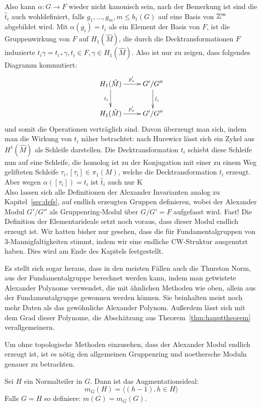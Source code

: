  Also kann $\alpha:G\to F$ wieder nicht kanonisch sein, nach der Bemerkung ist sind die $\hat t_i$ auch wohldefiniert, falls $g_1,\dots,g_m, m\leq b_1(G)$ auf eine Basis von $\mathbb{Z}^m$ abgebildet wird.
 Mit $\alpha(g_i)=t_i$ als ein Element der Basis von $F$, ist die Gruppenwirkung von $F$ auf $H_1(\hat M)$, die durch die Decktransformationen $F$ induzierte $t_i\gamma = t_{i*}\gamma,t_i \in F , \gamma \in H_1(\hat M)$. Also ist nur zu zeigen, dass folgendes Diagramm kommutiert:
\[
	\begin{xy}
		\xymatrix{H_1(\hat M) \ar[d]_{t_i} \ar[r]^{p'_*} & G'/G'' \ar[d]^{\hat t_i}\\
		H_1(\hat M)  \ar[r]^{p'_*} & G'/G'' }
	\end{xy}
\]
und somit die Operationen verträglich sind. Davon überzeugt man sich, indem man die Wirkung von $t_i$ näher betrachtet: nach Hurewicz lässt sich ein Zykel aus $H^1(\hat M)$ als Schleife darstellen. Die Decktransformation $t_i$ schiebt diese Schleife nun auf eine Schleife, die homolog ist zu der Konjugation mit einer zu einem Weg gelifteten Schleife $\tau_i, [\tau_i] \in \pi_1(M)$, welche die Decktransformation $t_i$ erzeugt. Aber wegen $\alpha([\tau_i])=t_i$ ist $\hat t_i$ auch nur K \\
Also lassen sich alle Definitionen der Alexander Invarianten analog zu Kapitel~\ref{sec:defs}, auf endlich erzeugten Gruppen definieren, wobei der Alexander Modul $G'/G''$ als Gruppenring-Modul über $G/G'=F$ aufgefasst wird. Fast! Die Definition der Elementarideale setzt noch voraus, dass dieser Modul endlich erzeugt ist. Wir hatten bisher nur gesehen, dass die für Fundamentalgruppen von 3-Mannigfaltigkeiten stimmt, indem wir eine endliche CW-Struktur ausgenutzt haben. Dies wird am Ende des Kapitels festgestellt.

Es stellt sich sogar heraus, dass in den meisten Fällen auch die Thurston Norm, aus der Fundamentalgruppe berechnet werden kann, indem man getwistete Alexander Polynome verwendet, die mit ähnlichen Methoden wie oben, allein aus der Fundamentalgruppe gewonnen werden können. Sie beinhalten meist noch mehr Daten als das gewöhnliche Alexander Polynom. Außerdem lässt sich mit dem Grad dieser Polynome, die Abschätzung aus Theorem~\ref{thm:haupttheorem} verallgemeinern.

Um ohne topologische Methoden einzusehen, dass der Alexander Modul endlich erzeugt ist, ist es nötig den allgemeinen Gruppenring und noethersche Moduln genauer zu betrachten.

\begin{defn}[Augmentationsideal]
\label{def:augmentation}
	Sei $H$ ein Normalteiler in $G$. Dann ist das Augmentationsideal:
	\[
		m_G(H) = \langle (h-1), h\in H \rangle
	\]
	Falls $G=H$ so definiere: $m(G)=m_G(G)$.
\end{defn}

